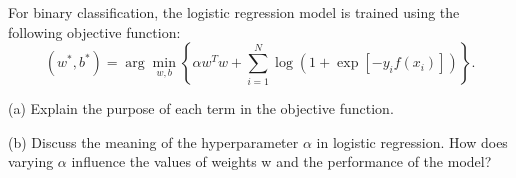 For binary classification, the logistic regression model is trained using the following objective function:
\[
(w^*,b^*)=\arg\min_{w,b}\left\{\alpha w^Tw+
\sum_{i=1}^N\log(1+\exp[-y_i f(x_i)])\right\}.
\]


(a) Explain the purpose of each term in the objective function.


(b) Discuss the meaning of the hyperparameter \ensuremath{\alpha} in logistic regression. How does varying \ensuremath{\alpha} influence the values of weights w and the performance of the model?
